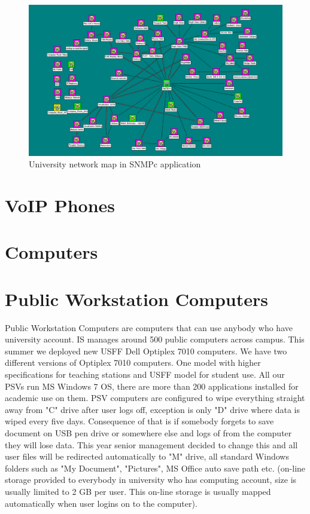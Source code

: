 \documentclass[10pt,a4paper,headinclude=true]{report}
\begin{document}
\begin{figure}[H]
\centering
\centerline{\includegraphics[scale=0.5]{./SNMPc_main}}
\caption{University network map in SNMPc application}
\label{fig:SNMPc_main}
\end{figure}

\section{VoIP Phones}
\section{Computers}
\section{Public Workstation Computers}
Public Workstation Computers are computers that can use anybody who have university account. IS manages around 500 public computers across campus. This summer we deployed new USFF Dell Optiplex 7010 \cite{PSVs} computers. We have two different versions of Optiplex 7010 computers. One model with higher specifications for teaching stations and USFF model for student use. All our PSVs run MS Windows 7 OS, there are more than 200 applications installed for academic use on them. PSV computers are configured to wipe everything straight away from "C" drive after user logs off, exception is only "D" drive where data is wiped every five days. Consequence of that is if somebody forgets to save document on USB pen drive or somewhere else and logs of from the computer they will lose data. This year senior management decided to change this and all user files will be redirected automatically to "M" drive, all standard Windows folders such as "My Document", "Pictures", MS Office auto save path etc. (on-line storage provided to everybody in university who has computing account, size is usually limited to 2 GB per user. This on-line storage is usually mapped automatically when user logins on to the computer).
\end{document}
